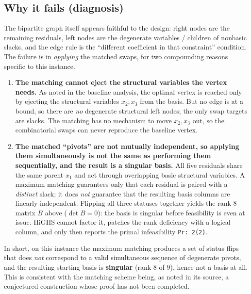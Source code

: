 \documentclass[11pt]{article}
\begin{document}
\subsection*{Why it fails (diagnosis)}

The bipartite graph itself appears faithful to the design: right nodes are the
remaining residuals, left nodes are the degenerate variables / children of
nonbasic slacks, and the edge rule is the ``different coefficient in that
constraint'' condition. The failure is in \emph{applying} the matched swaps, for
two compounding reasons specific to this instance.

\begin{enumerate}[label=(\roman*)]
  \item \textbf{The matching cannot eject the structural variables the vertex
  needs.} As noted in the baseline analysis, the optimal vertex is reached only
  by ejecting the structural variables $x_2,x_3$ from the basis. But no edge is
  at a bound, so there are \emph{no} degenerate structural left nodes; the only
  swap targets are slacks. The matching has no mechanism to move $x_2,x_3$ out,
  so the combinatorial swaps can never reproduce the baseline vertex.

  \item \textbf{The matched ``pivots'' are not mutually independent, so applying
  them simultaneously is not the same as performing them sequentially, and the
  result is a singular basis.} All five residuals share the same parent $x_1$ and
  act through overlapping basic structural variables. A maximum matching
  guarantees only that each residual is paired with a \emph{distinct} slack; it
  does \emph{not} guarantee that the resulting basis columns are linearly
  independent. Flipping all three statuses together yields the rank-$8$ matrix
  $B$ above ($\det B = 0$): the basis is singular before feasibility is even at
  issue. HiGHS cannot factor it, patches the rank deficiency with a logical
  column, and only then reports the primal infeasibility \texttt{Pr: 2(2)}.
\end{enumerate}

In short, on this instance the maximum matching produces a set of status flips
that does \emph{not} correspond to a valid simultaneous sequence of degenerate
pivots, and the resulting starting basis is \textbf{singular} (rank $8$ of $9$),
hence not a basis at all. This is consistent with the matching scheme being, as
noted in its source, a conjectured construction whose proof has not been
completed.
\end{document}
